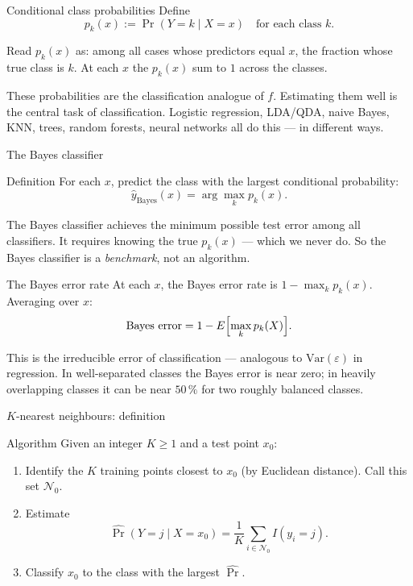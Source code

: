 \documentclass[aspectratio=169,11pt]{beamer}
\begin{document}
\begin{frame}{Conditional class probabilities}
  Define
  \[
    \boxed{\;p_k(x) := \Pr(Y = k \mid X = x) \quad \text{for each class } k.\;}
  \]
  \begin{readme}
    Read $p_k(x)$ as: among all cases whose predictors equal $x$, the
    fraction whose true class is $k$. At each $x$ the $p_k(x)$ sum to
    $1$ across the classes.
  \end{readme}
  \begin{takeaway}
    These probabilities are the classification analogue of $f$.
    Estimating them well is the central task of classification.
    Logistic regression, LDA/QDA, naive Bayes, KNN, trees, random forests, neural networks
    all do this --- in different ways.
  \end{takeaway}
\end{frame}

\begin{frame}{The Bayes classifier}
  \begin{block}{Definition}
    For each $x$, predict the class with the largest conditional
    probability:
    \[
      \boxed{\;\hat y_{\text{Bayes}}(x) = \arg\max_k p_k(x).\;}
    \]
  \end{block}
  \begin{takeaway}
    The Bayes classifier achieves the minimum possible test error
    among all classifiers. It requires knowing the true $p_k(x)$ ---
    which we never do. So the Bayes classifier is a \emph{benchmark},
    not an algorithm.
  \end{takeaway}
\end{frame}

\begin{frame}{The Bayes error rate}
  At each $x$, the Bayes error rate is $1 - \max_k p_k(x)$.
  Averaging over $x$:
  \[
    \mathrm{Bayes\ error} = 1 - E\Bigl[\max_k p_k(X)\Bigr].
  \]
  \begin{readme}
    This is the irreducible error of classification --- analogous to
    $\mathrm{Var}(\varepsilon)$ in regression. In well-separated
    classes the Bayes error is near zero; in heavily overlapping
    classes it can be near $50\,\%$ for two roughly balanced classes.
  \end{readme}
\end{frame}

\begin{frame}{$K$-nearest neighbours: definition}
  \begin{block}{Algorithm}
    Given an integer $K \ge 1$ and a test point $x_0$:
    \begin{enumerate}
      \item Identify the $K$ training points closest to $x_0$ (by
            Euclidean distance). Call this set $\mathcal{N}_0$.
      \item Estimate
            \[
              \hat \Pr(Y = j \mid X = x_0)
              = \frac{1}{K}\sum_{i \in \mathcal{N}_0} I(y_i = j).
            \]
      \item Classify $x_0$ to the class with the largest $\hat\Pr$.
    \end{enumerate}
  \end{block}
\end{frame}
\end{document}
